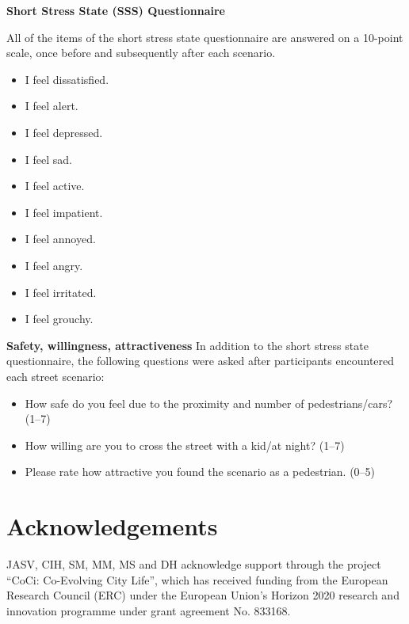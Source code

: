 \noindent \textbf{Short Stress State (SSS) Questionnaire} \label{apx:ssq}

\noindent All of the items of the short stress state questionnaire \cite{helton2004validation} are answered on a 10-point scale, once before and subsequently after each scenario.

\begin{multicols}{3}
    \begin{itemize}
    \item I feel dissatisfied.
    \item I feel alert.
    \item I feel depressed. 
    \item I feel sad.
    \item I feel active.
    \item I feel impatient. 
    \item I feel annoyed. 
    \item I feel angry.
    \item I feel irritated. 
    \item I feel grouchy.
    \end{itemize}
\end{multicols}

\noindent \textbf{Safety, willingness, attractiveness}
\label{apx:PLOS}
\noindent In addition to the short stress state questionnaire, the following questions were asked after participants encountered each street scenario:

\begin{itemize}
\item How safe do you feel due to the proximity and number of pedestrians/cars? (1--7)
\item How willing are you to cross the street with a kid/at night? (1--7)
\item Please rate how attractive you found the scenario as a pedestrian. (0--5)
\end{itemize}


\section{Acknowledgements}
JASV, CIH, SM, MM, MS and DH acknowledge support through the project ``CoCi: Co-Evolving City Life'', which has received funding from the European Research Council (ERC) under the European Union’s Horizon 2020 research and innovation programme under grant agreement No. 833168.


